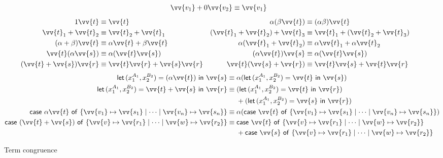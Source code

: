\documentclass[runningheads,orivec,envcountsame,envcountsect]{llncs}
\def\Pair#1#2{(#1,#2)} %
\def\letkeyword{\mathsf{let}}
\def\inkeyword{\mathsf{in}}
\def\LetP#1#2#3#4#5#6{\letkeyword\,\Pair{#1^{#2}}{#3^{#4}}=#5~\inkeyword~#6}
\def\gencase#1#2#3#4#5{\ensuremath{\mathsf{case}~#1~\mathsf{of}~\{#2\mapsto #4 \mid \dotsb \mid #3\mapsto #5\}}}
\begin{document}
\begin{table}[t]
  \begin{align*}
    \vv{v_1} + 0\vv{v_2} &\equiv \vv{v_1}
  \end{align*}
  \begin{align*}
    1\vv{t} &\equiv \vv{t} &
    \alpha(\beta\vv{t}) &\equiv (\alpha\beta)\vv{t} \\
    \vv{t}_1+\vv{t}_2 &\equiv \vv{t}_2+\vv{t}_1 &
    (\vv{t}_1+\vv{t}_2)+\vv{t}_3 &\equiv \vv{t}_1+(\vv{t}_2+\vv{t}_3) \\
    (\alpha+\beta)\vv{t} &\equiv \alpha\vv{t}+\beta\vv{t} &
    \alpha(\vv{t}_1+\vv{t}_2) &\equiv \alpha\vv{t}_1+\alpha\vv{t}_2 \\
    \vv{t}(\alpha\vv{s}) &\equiv \alpha(\vv{t}\vv{s}) &
    (\alpha\vv{t})\vv{s} &\equiv \alpha(\vv{t}\vv{s}) \\
    (\vv{t}+\vv{s})\vv{r} &\equiv \vv{t}\vv{r}+\vv{s}\vv{r} &
    \vv{t}(\vv{s}+\vv{r}) &\equiv \vv{t}\vv{s}+\vv{t}\vv{r} &&
  \end{align*}
  \begin{align*}
    \LetP{x_1}{A_1}{x_2}{B_2}{(\alpha\vv{t})}{\vv{s}}
    &\equiv \alpha(\LetP{x_1}{A_1}{x_2}{B_2}{\vv{t}}{\vv{s}}) \\
    \LetP{x_1}{A_1}{x_2}{B_2}{\vv{t}+\vv{s}}{\vv{r}}
    &
    \equiv
    \begin{aligned}[t]
      &(\LetP{x_1}{A_1}{x_2}{B_2}{\vv{t}}{\vv{r}})\\
      &+(\LetP{x_1}{A_1}{x_2}{B_2}{\vv{s}}{\vv{r}}) 
    \end{aligned}\\
    \gencase{\alpha \vv{t}}{\vv{v_1}}{\vv{v_n}}{\vv{s_1}}{\vv{s_n}}
    &\equiv \alpha(\gencase{\vv{t}}{\vv{v_1}}{\vv{v_n}}{\vv{s_1}}{\vv{s_n}}) \\
    \gencase{(\vv{t}+\vv{s})}{\vv{v}}{\vv{w}}{\vv{r_1}}{\vv{r_2}}
    &\equiv\begin{aligned}[t]
      &\gencase{\vv{t}}{\vv{v}}{\vv{w}}{\vv{r_1}}{\vv{r_2}}\\
      &+\gencase{\vv{s}}{\vv{v}}{\vv{w}}{\vv{r_1}}{\vv{r_2}}
    \end{aligned}
  \end{align*}
  \caption{Term congruence}
  \label{tab:Congruence}
\end{table}
\end{document}
